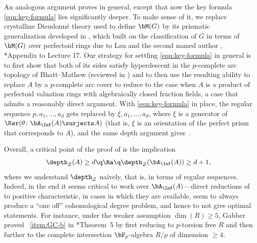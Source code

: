 An analogous argument proves  in general, except that now the key formula \eqref{eqn:key-formula} lies significantly deeper. To make sense of it, we replace crystalline Dieudonn\'{e} theory used to define $\bM(G)$ by its prismatic generalization developed in \cite{ALB20}, which built on the classification of $G$ in terms of $\bM(G)$ over perfectoid rings due to Lau and the second named author \cite{Lau13}, \cite{SW19}*{Appendix to Lecture 17}. Our strategy for settling \eqref{eqn:key-formula} in general is to first show that both of its sides satisfy hyperdescent in the $p$-complete arc topology of Bhatt--Mathew \cite{BM20} (reviewed in \uS{}) and to then use the resulting ability to replace $A$ by a $p$-complete arc cover to reduce to the case when $A$ is a product of perfectoid valuation rings with algebraically closed fraction fields, a case that admits a reasonably direct argument.
 With \eqref{eqn:key-formula} in place, the regular sequence $p, a_1, \dotsc, a_d$ gets replaced by $\xi, a_1, \dotsc, a_d$, where $\xi$ is a generator of $\Ker(\theta\colon \bA_\Inf(A) \surjects A)$ (that is, $\xi$ is an orientation of the perfect prism that corresponds to $A$), and the same depth argument gives~.

Overall, a critical point of the proof of  is the implication
\[
\depth_Z(A) \ge d \q \Ra \q \depth_Z(\bA_\Inf(A)) \ge d + 1,
\]
where we understand $\depth_Z$ na\"{i}vely, that is, in terms of regular sequences. Indeed, in the end it seems critical to work over $\bA_\Inf(A)$---direct reductions of  to positive characteristic, in cases in which they are available, seem to always produce a ``one off'' cohomological degree problem, and hence to not give optimal statements. For instance, under the weaker assumption $\dim(R) \ge 5$, Gabber proved ~\ref{item:GC-b} in \cite{Gab04}*{Theorem~5}  by first reducing to $p$-torsion free $R$ and then further to the complete intersection $\bF_p$-algebra $R/p$ of dimension $\ge 4$.








